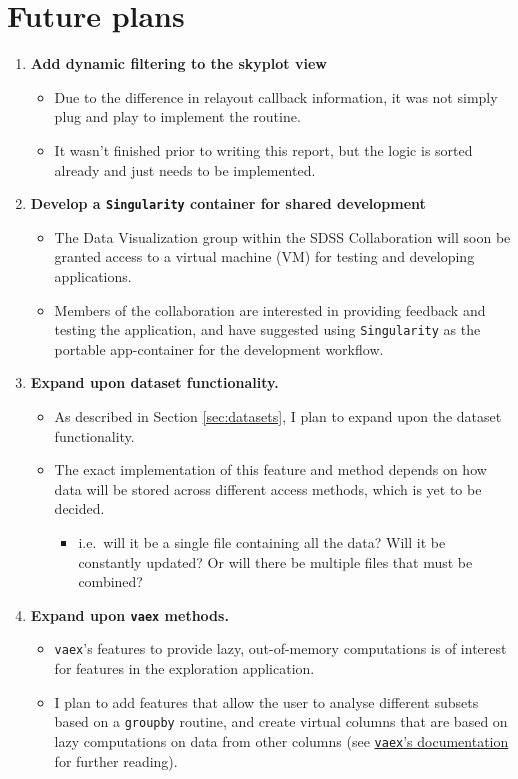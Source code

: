 \documentclass[a4paper,10pt,twocolumn]{article}
\begin{document}
\section{Future plans}
\begin{enumerate}
	\item \textbf{Add dynamic filtering to the skyplot view}
	      \begin{itemize}
		      \item Due to the difference in relayout callback information, it was not simply plug and play to implement the routine.
		      \item It wasn't finished prior to writing this report, but the logic is sorted already and just needs to be implemented.
	      \end{itemize}
	      \item\textbf{Develop a \texttt{Singularity} container for shared development}
	      \begin{itemize}
		      \item The Data Visualization group within the SDSS Collaboration will soon be granted access to a virtual machine (VM) for testing and developing applications.
		      \item Members of the collaboration are interested in providing feedback and testing the application, and have suggested using \texttt{Singularity} \parencite{singularity} as the portable app-container for the development workflow.
	      \end{itemize}
	\item \textbf{Expand upon dataset functionality.}
	      \begin{itemize}
		      \item As described in Section \ref{sec:datasets}, I plan to expand upon the dataset functionality.
		      \item The exact implementation of this feature and method depends on how data will be stored across different access methods, which is yet to be decided.
		            \begin{itemize}
			            \item i.e.\ will it be a single file containing all the data? Will it be constantly updated? Or will there be multiple files that must be combined?
		            \end{itemize}
	      \end{itemize}
	\item \textbf{Expand upon \texttt{vaex} methods.}
	      \begin{itemize}
		      \item \texttt{vaex}'s features to provide lazy, out-of-memory computations is of interest for features in the exploration application.
		      \item I plan to add features that allow the user to analyse different subsets based on a \texttt{groupby} routine, and create virtual columns that are based on lazy computations on data from other columns (see \href{https://vaex.io/docs/tutorial.html#Virtual-columns}{\texttt{vaex}'s documentation} for further reading).
	      \end{itemize}
\end{enumerate}

\printbibliography
\end{document}
